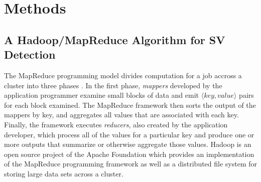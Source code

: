 \documentclass[12pt]{article}
\begin{document}
\section{Methods}\label{Methods}

\subsection{A Hadoop/MapReduce Algorithm for SV Detection}

The MapReduce programming model divides computation for a job accross a cluster into three phases \cite{Dean:2008p277}. In the first phase, \emph{mappers} developed by the application programmer examine small blocks of data and emit $\langle key, value \rangle$ pairs for each block examined. The MapReduce framework then sorts the output of the mappers by key, and aggregates all values that are associated with each key. Finally, the framework executes \emph{reducers}, also created by the application developer, which process all of the values for a particular key and produce one or more outputs that summarize or otherwise aggregate those values. Hadoop is an open source project of the Apache Foundation which provides an implementation of the MapReduce programming framework as well as a distributed file system for storing large data sets across a cluster.
\end{document}
